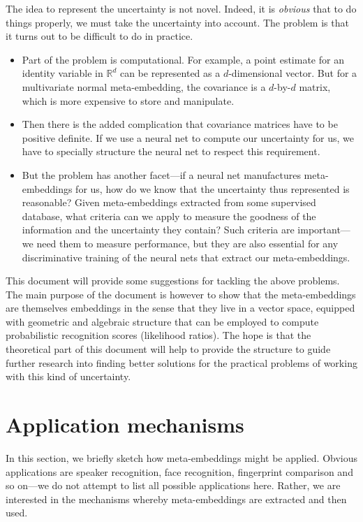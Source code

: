 \documentclass[a4paper,oneside,12pt,english]{report}
\def\R{\mathbb{R}}
\begin{document}
The idea to represent the uncertainty is not novel. Indeed, it is \emph{obvious} that to do things properly, we must take the uncertainty into account. The problem is that it turns out to be difficult to do in practice. 
\begin{itemize}
	\item Part of the problem is computational. For example, a point estimate for an identity variable in $\R^d$ can be represented as a $d$-dimensional vector. But for a multivariate normal meta-embedding, the covariance is a $d$-by-$d$ matrix, which is more expensive to store and manipulate. 
	\item Then there is the added complication that covariance matrices have to be positive definite. If we use a neural net to compute our uncertainty for us, we have to specially structure the neural net to respect this requirement. 
	\item But the problem has another facet---if a neural net manufactures meta-embeddings for us, how do we know that the uncertainty thus represented is reasonable? Given meta-embeddings extracted from some supervised database, what criteria can we apply to measure the goodness of the information and the uncertainty they contain? Such criteria are important---we need them to measure performance, but they are also essential for any discriminative training of the neural nets that extract our meta-embeddings.
\end{itemize}
This document will provide some suggestions for tackling the above problems.\\ 

\noindent The main purpose of the document is however to show that the meta-embeddings are themselves embeddings in the sense that they live in a vector space, equipped with geometric and algebraic structure that can be employed to compute probabilistic recognition scores (likelihood ratios). The hope is that the theoretical part of this document will help to provide the structure to guide further research into finding better solutions for the practical problems of working with this kind of uncertainty.    

\section{Application mechanisms}
In this section, we briefly sketch how meta-embeddings might be applied. Obvious applications are speaker recognition, face recognition, fingerprint comparison and so on---we do not attempt to list all possible applications here. Rather, we are interested in the mechanisms whereby meta-embeddings are extracted and then used. 
\end{document}
